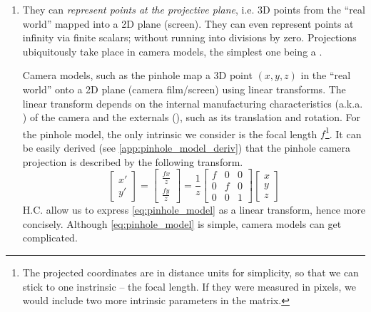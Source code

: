 \documentclass[a4paper]{article}
\begin{document}
\begin{enumerate}
    \item They can \textit{represent points at the projective plane}, i.e. 3D points from the ``real world'' mapped into a 2D plane (screen). They can even represent points at infinity via finite scalars; without running into divisions by zero. Projections ubiquitously take place in camera models, the simplest one being a .
    
    Camera models, such as the pinhole map a 3D point $(x,y,z)$ in the ``real world'' onto a 2D plane (camera film/screen) using linear transforms. The linear transform depends on the internal manufacturing characteristics (a.k.a. ) of the camera and the externals (), such as its translation and rotation. For the pinhole model, the only intrinsic we consider is the focal length $f$\footnote{The projected coordinates are in distance units for simplicity, so that we can stick to one instrinsic -- the focal length. If they were measured in pixels, we would include two more intrinsic parameters in the matrix.}. It can be easily derived (see \ref{app:pinhole_model_deriv}) that the pinhole camera projection is described by the following transform.
    \begin{equation}
        \begin{bmatrix}
            x\prime \\
            y\prime 
        \end{bmatrix} 
        =
        \begin{bmatrix}
            \frac{fx}{z} \\
            \frac{fy}{z} 
        \end{bmatrix} = 
         \frac{1}{z}\begin{bmatrix}
            f & 0 & 0 \\
            0 & f & 0 \\
            0 & 0 & 1
        \end{bmatrix}
        \begin{bmatrix}
            x \\ y \\ z
        \end{bmatrix}
        \label{eq:pinhole_model}
    \end{equation}
    H.C. allow us to express \eqref{eq:pinhole_model} as a linear transform, hence more concisely. Although \eqref{eq:pinhole_model} is simple, camera models can get complicated.
\end{enumerate}
\end{document}
